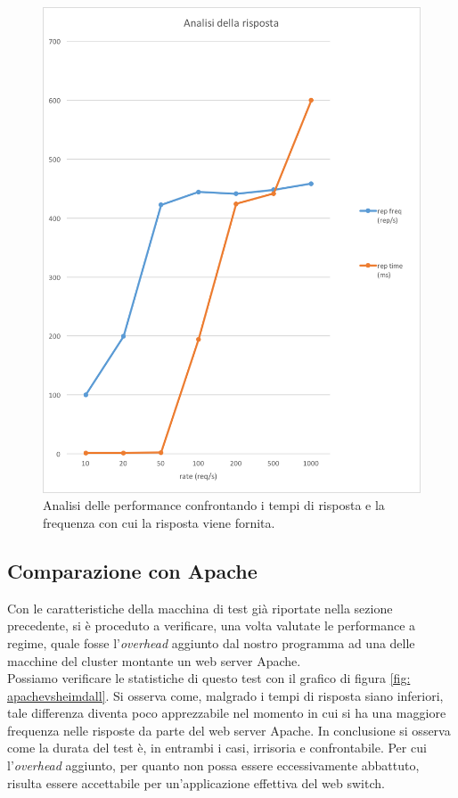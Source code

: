 \documentclass[italian]{tktltiki2}
\begin{document}
\begin{figure}[H]
\centering
\includegraphics[width=\textwidth]{images/repvsfreq}
\caption{Analisi delle performance confrontando i tempi di risposta e la frequenza con cui la risposta viene fornita.\label{fig: repvsfreq}}
\end{figure}\subsection{Comparazione con Apache}
Con le caratteristiche della macchina di test già riportate nella sezione precedente, si è proceduto a verificare, una volta valutate le performance a regime, quale fosse l'\emph{overhead} aggiunto dal nostro programma ad una delle macchine del cluster montante un web server Apache. \\
Possiamo verificare le statistiche di questo test con il grafico di figura \ref{fig: apachevsheimdall}. Si osserva come, malgrado i tempi di risposta siano inferiori, tale differenza diventa poco apprezzabile nel momento in cui si ha una maggiore frequenza nelle risposte da parte del web server Apache. In conclusione si osserva come la durata del test è, in entrambi i casi, irrisoria e confrontabile. Per cui l'\emph{overhead} aggiunto, per quanto non possa essere eccessivamente abbattuto, risulta essere accettabile per un'applicazione effettiva del web switch.
\end{document}
